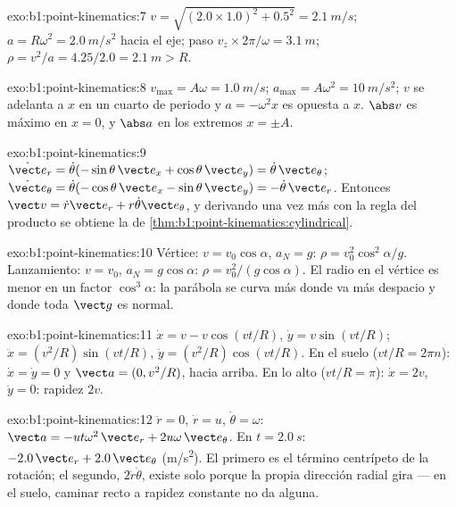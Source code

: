\begin{solution}{exo:b1:point-kinematics:7}
$v = \sqrt{(2.0 \times 1.0)^2 + 0.5^2} = \qty{2.1}{m/s}$; $a = R\omega^2 =
\qty{2.0}{m/s^2}$ hacia el eje; paso $v_z \times 2\pi/\omega =
\qty{3.1}{m}$; $\rho = v^2/a = 4.25/2.0 = \qty{2.1}{m} > R$.
\end{solution}

\begin{solution}{exo:b1:point-kinematics:8}
$v_{\max} = A\omega = \qty{1.0}{m/s}$; $a_{\max} = A\omega^2 = \qty{10}{m/s^2}$;
$v$ se adelanta a $x$ en un cuarto de periodo y $a = -\omega^2x$ es
opuesta a $x$. $\abs v$ es máximo en $x = 0$, y $\abs a$ en los extremos $x = \pm A$.
\end{solution}

\begin{solution}{exo:b1:point-kinematics:9}
$\dot{\vect e}_r = \dot\theta(-\sin\theta\,\vect e_x + \cos\theta\,\vect e_y)
= \dot\theta\,\vect e_\theta$; $\dot{\vect e}_\theta = \dot\theta(-\cos\theta\,
\vect e_x - \sin\theta\,\vect e_y) = -\dot\theta\,\vect e_r$. Entonces
$\vect v = \dot r\vect e_r + r\dot\theta\vect e_\theta$, y derivando una
vez más con la regla del producto se obtiene la  de
\cref{thm:b1:point-kinematics:cylindrical}.
\end{solution}

\begin{solution}{exo:b1:point-kinematics:10}
Vértice: $v = v_0\cos\alpha$, $a_N = g$: $\rho = v_0^2\cos^2\alpha/g$.
Lanzamiento: $v = v_0$, $a_N = g\cos\alpha$: $\rho = v_0^2/(g\cos\alpha)$.
El radio en el vértice es menor en un factor $\cos^3\alpha$: la parábola
se curva más donde va más despacio y donde toda $\vect g$ es normal.
\end{solution}

\begin{solution}{exo:b1:point-kinematics:11}
$\dot x = v - v\cos(vt/R)$, $\dot y = v\sin(vt/R)$; $\ddot x = (v^2/R)
\sin(vt/R)$, $\ddot y = (v^2/R)\cos(vt/R)$. En el suelo ($vt/R = 2\pi n$):
$\dot x = \dot y = 0$ y $\vect a = (0, v^2/R)$, hacia arriba. En lo alto
($vt/R = \pi$): $\dot x = 2v$, $\dot y = 0$: rapidez $2v$.
\end{solution}

\begin{solution}{exo:b1:point-kinematics:12}
$\ddot r = 0$, $\dot r = u$, $\dot\theta = \omega$: $\vect a = -ut\omega^2\,
\vect e_r + 2u\omega\,\vect e_\theta$. En $t = \qty{2.0}{s}$: $-2.0\,\vect e_r
+ 2.0\,\vect e_\theta$ (\unit{m/s^2}). El primero es el término centrípeto
de la rotación; el segundo, $2\dot r\dot\theta$, existe solo porque la
propia dirección radial gira --- en el suelo, caminar recto a rapidez
constante no da  alguna.
\end{solution}

